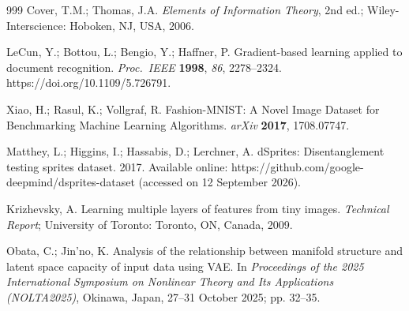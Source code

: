 \documentclass[11pt,a4paper]{jsarticle}
\begin{document}
\begin{thebibliography}{999}
Cover, T.M.; Thomas, J.A.
\textit{Elements of Information Theory}, 2nd ed.;
Wiley-Interscience: Hoboken, NJ, USA, 2006.

LeCun, Y.; Bottou, L.; Bengio, Y.; Haffner, P.
Gradient-based learning applied to document recognition.
\textit{Proc.\ IEEE} \textbf{1998}, \textit{86}, 2278--2324.
https://doi.org/10.1109/5.726791.

Xiao, H.; Rasul, K.; Vollgraf, R.
Fashion-{MNIST}: A Novel Image Dataset for Benchmarking Machine Learning
Algorithms.
\textit{arXiv} \textbf{2017}, 1708.07747.

Matthey, L.; Higgins, I.; Hassabis, D.; Lerchner, A.
dSprites: Disentanglement testing sprites dataset. 2017.
Available online: https://github.com/google-deepmind/dsprites-dataset
(accessed on 12 September 2026).

Krizhevsky, A.
Learning multiple layers of features from tiny images.
\textit{Technical Report}; University of Toronto: Toronto, ON, Canada,
2009.

Obata, C.; Jin'no, K.
Analysis of the relationship between manifold structure and latent space
capacity of input data using VAE.
In \textit{Proceedings of the 2025 International Symposium on Nonlinear
Theory and Its Applications (NOLTA2025)}, Okinawa, Japan, 27--31 October
2025; pp. 32--35.

\end{thebibliography}
\end{document}
